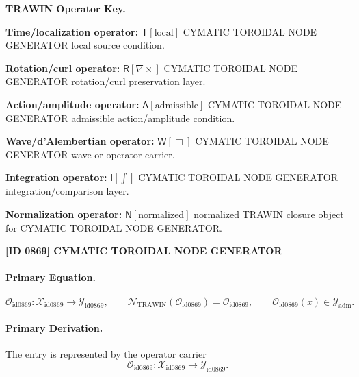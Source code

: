 \par\vspace{0.45\baselineskip}
\noindent\begin{minipage}[t]{\linewidth}
\begingroup
\small
\raggedright
\textbf{TRAWIN Operator Key.}\par
\noindent\textbf{Time/localization operator:} $\mathsf{T}\!\left[\mathrm{local}\right]$ CYMATIC TOROIDAL NODE GENERATOR local source condition.\par
\noindent\textbf{Rotation/curl operator:} $\mathsf{R}\!\left[\nabla\times\right]$ CYMATIC TOROIDAL NODE GENERATOR rotation/curl preservation layer.\par
\noindent\textbf{Action/amplitude operator:} $\mathsf{A}\!\left[\mathrm{admissible}\right]$ CYMATIC TOROIDAL NODE GENERATOR admissible action/amplitude condition.\par
\noindent\textbf{Wave/d'Alembertian operator:} $\mathsf{W}\!\left[\Box\right]$ CYMATIC TOROIDAL NODE GENERATOR wave or operator carrier.\par
\noindent\textbf{Integration operator:} $\mathsf{I}\!\left[\int\right]$ CYMATIC TOROIDAL NODE GENERATOR integration/comparison layer.\par
\noindent\textbf{Normalization operator:} $\mathsf{N}\!\left[\mathrm{normalized}\right]$ normalized TRAWIN closure object for CYMATIC TOROIDAL NODE GENERATOR.\par
\endgroup
\end{minipage}

\clearpage
\noindent\textbf{[ID 0869] CYMATIC TOROIDAL NODE GENERATOR}\par
\vspace{0.35em}
\paragraph{Primary Equation.}
\[
\mathcal{O}_{\mathrm{id0869}}:\mathcal{X}_{\mathrm{id0869}}\longrightarrow \mathcal{Y}_{\mathrm{id0869}},\qquad
\mathcal{N}_{\mathrm{TRAWIN}}(\mathcal{O}_{\mathrm{id0869}})=\mathcal{O}_{\mathrm{id0869}},\qquad
\mathcal{O}_{\mathrm{id0869}}(x)\in\mathcal{Y}_{\mathrm{adm}}.
\]

\paragraph{Primary Derivation.} The entry is represented by the operator carrier\[
\mathcal{O}_{\mathrm{id0869}}:\mathcal{X}_{\mathrm{id0869}}\longrightarrow \mathcal{Y}_{\mathrm{id0869}}.
\]

